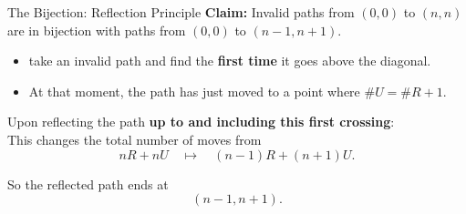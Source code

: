 \begin{frame}{The Bijection: Reflection Principle}
  \textcolor{sqt-question}{
    \textbf{Claim:}
    Invalid paths from \((0,0)\) to \((n,n)\) are in bijection with paths
    from \((0,0)\) to \((n-1,n+1)\).
  }
  \begin{itemize}
    \item take an invalid path and find the \textbf{first time} it goes above the diagonal.
    \item At that moment, the path has just moved to a point where $\#U = \#R + 1$.
  \end{itemize}
  Upon reflecting the path \textbf{up to and including this first crossing}:\\

  This changes the total number of moves from
  \[
    nR + nU
    \quad \longmapsto \quad
    (n-1)R + (n+1)U.
  \]

  So the reflected path ends at
  \[
    (n-1,n+1).
  \]
\end{frame}


